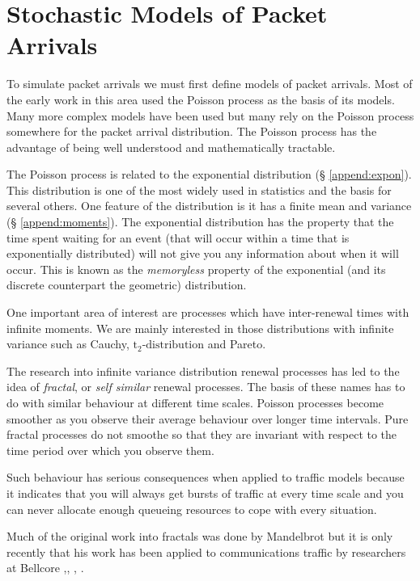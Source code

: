\chapter{Stochastic Models of Packet Arrivals}
\label{models}

To simulate packet arrivals we must first define models of packet
arrivals.  Most of the early work in this area used the Poisson
process \cite{grimmett} as the basis of its models.  Many more complex
models have been used but many rely on the Poisson process somewhere
for the packet arrival distribution.  The Poisson process has the
advantage of being well understood and mathematically tractable.


The Poisson process is related to the exponential distribution (\S
\ref{append:expon}).  This distribution is one of the most widely
used in statistics and the basis for several others.  One feature of
the distribution is it has a finite mean and variance (\S
\ref{append:moments}).  The exponential distribution has the property
that the time spent waiting for an event (that will occur within a
time that is exponentially distributed) will not give you any
information about when it will occur.  This is known as the {\em
memoryless} property of the exponential (and its discrete counterpart
the geometric) distribution.

One important area of interest are processes which have inter-renewal
times with infinite moments.  We are mainly interested in those
distributions with infinite variance such as Cauchy,
$\mbox{t}_2\mbox{-distribution}$ and Pareto.

The research into infinite variance distribution renewal processes has
led to the idea of {\em fractal}, or {\em self similar} renewal
processes.  The basis of these names has to do with similar behaviour
at different time scales.  Poisson processes become smoother as you
observe their average behaviour over longer time intervals.  Pure
fractal processes do not smoothe so that they are invariant with
respect to the time period over which you observe them.

Such behaviour has serious consequences when applied to traffic models
because it indicates that you will always get bursts of traffic at
every time scale and you can never allocate enough queueing resources
to cope with every situation.

Much of the original work into fractals was done by Mandelbrot
\cite{IEEE:Mandelbrot} but it is only recently that his work has been
applied to communications traffic by researchers at Bellcore
\cite{Bell:1},\cite{Bell:2}, \cite{Bell:3}, \cite{Bell:4}.

